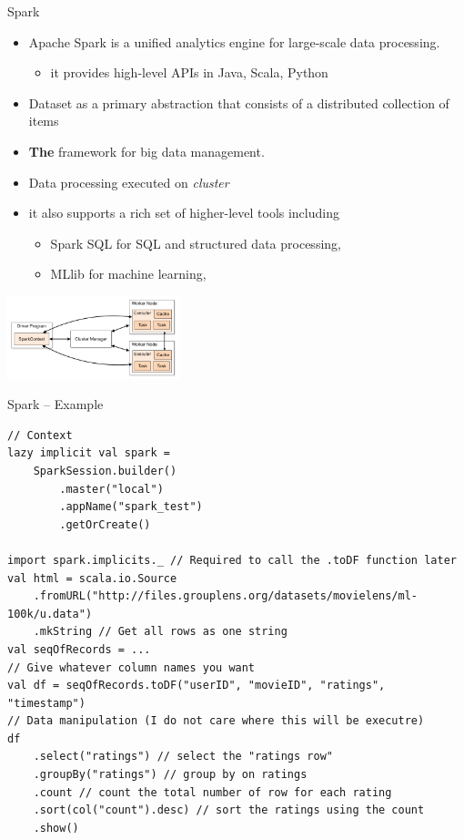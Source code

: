 \documentclass[presentation, 9pt]{beamer}\mode<presentation>{\usetheme{AMSBolognaFC}}
\begin{document}
\begin{frame}{Spark \href{https://spark.apache.org/}{\faLink}}
	\begin{itemize}
		\item Apache Spark is a unified analytics engine for large-scale data processing.
		\begin{itemize}
			\item it provides high-level APIs in Java, Scala, Python
		\end{itemize}
		\item Dataset as a primary abstraction that consists of a distributed collection of items 
  	\item \textbf{The} framework for big data management.
   \item Data processing executed on \emph{cluster}
   	\item it also supports a rich set of higher-level tools including 
		 \begin{itemize}
			\item Spark SQL for SQL and structured data processing, 
   		\item MLlib for machine learning,  
		 \end{itemize}
	\end{itemize}
	\centering
	\includegraphics[width=5cm]{img/cluster-overview.png}
\end{frame}
\begin{frame}[fragile]{Spark -- Example \href{https://github.com/cric96/spark-mini-example}{\faLink}}
	\begin{alertblock}{}
		\begin{tcolorbox}[left=0pt, top=0pt, bottom=0pt]
			\begin{verbatim}
// Context
lazy implicit val spark =
	SparkSession.builder()
		.master("local")
		.appName("spark_test")
		.getOrCreate()

import spark.implicits._ // Required to call the .toDF function later
val html = scala.io.Source
	.fromURL("http://files.grouplens.org/datasets/movielens/ml-100k/u.data")
	.mkString // Get all rows as one string
val seqOfRecords = ...
// Give whatever column names you want
val df = seqOfRecords.toDF("userID", "movieID", "ratings", "timestamp")
// Data manipulation (I do not care where this will be executre)
df
	.select("ratings") // select the "ratings row"
	.groupBy("ratings") // group by on ratings
	.count // count the total number of row for each rating
	.sort(col("count").desc) // sort the ratings using the count
	.show()
			\end{verbatim}
		\end{tcolorbox}
	\end{alertblock}
\end{frame}
\end{document}
